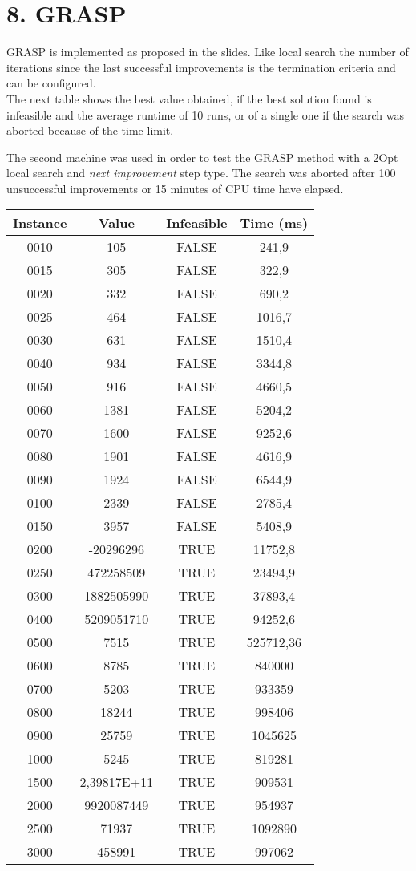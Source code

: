 \section*{8. GRASP}
GRASP is implemented as proposed in the slides. Like local search the number of iterations since the last successful improvements is the termination criteria and can be configured. \\ 

The next table shows the best  value obtained, if the best solution found is infeasible and the average runtime of 10 runs, or of a single one if the search was aborted because of the time limit.

The second machine was used in order to test the GRASP method with a 2Opt local search and \textit{next improvement} step type. The search was aborted after 100 unsuccessful improvements or 15 minutes of CPU time have elapsed.

\begin{center}
	\begin{tabular}{||c | c | c | c||} 
		\hline
		Instance  & Value & Infeasible & Time (ms) \\
		\hline\hline
		0010	& 	105	& 	FALSE	& 	241,9	\\
		0015	& 	305	& 	FALSE	& 	322,9	\\
		0020	& 	332	& 	FALSE	& 	690,2	\\
		0025	& 	464	& 	FALSE	& 	1016,7	\\
		0030	& 	631	& 	FALSE	& 	1510,4	\\
		0040	& 	934	& 	FALSE	& 	3344,8	\\
		0050	& 	916	& 	FALSE	& 	4660,5	\\
		0060	& 	1381	& 	FALSE	& 	5204,2	\\
		0070	& 	1600	& 	FALSE	& 	9252,6	\\
	0080	& 	1901	& 	FALSE	& 	4616,9	\\
	0090	& 	1924	& 	FALSE	& 	6544,9	\\
	0100	& 	2339	& 	FALSE	& 	2785,4	\\
	0150	& 	3957	& 	FALSE	& 	5408,9	\\
	0200	& 	-20296296	& 	TRUE	& 	11752,8	\\
	0250	& 	472258509	& 	TRUE	& 	23494,9	\\
	0300	& 	1882505990	& 	TRUE	& 	37893,4	\\
	0400	& 	5209051710	& 	TRUE	& 	94252,6	\\
		0500	&	7515	&	TRUE	&	525712,36	\\
		0600	&	8785	&	TRUE	&	840000	\\
		0700	&	5203	&	TRUE	&	933359	\\
		0800	&	18244	&	TRUE	&	998406	\\
		0900	&	25759	&	TRUE	&	1045625	\\
		1000	&	5245	&	TRUE	&	819281	\\
		1500	&	2,39817E+11	&	TRUE	&	909531	\\
		2000	&	9920087449	&	TRUE	&	954937	\\
		2500	&	71937	&	TRUE	&	1092890	\\
		3000	&	458991	&	TRUE	&	997062	\\
		\hline
	\end{tabular}
\end{center}